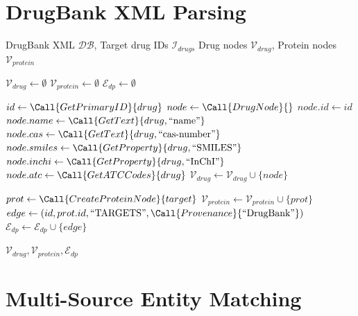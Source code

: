\documentclass[11pt,a4paper]{article}
\begin{document}
\newpage
\section{DrugBank XML Parsing}

\begin{algorithm}[H]
\caption{ParseDrugBank: Extract Drug Information from XML}
\label{alg:drugbank}
\begin{algorithmic}[1]
\REQUIRE DrugBank XML $\mathcal{DB}$, Target drug IDs $\mathcal{I}_{drugs}$
\ENSURE Drug nodes $\mathcal{V}_{drug}$, Protein nodes $\mathcal{V}_{protein}$

\STATE $\mathcal{V}_{drug} \gets \emptyset$
\STATE $\mathcal{V}_{protein} \gets \emptyset$
\STATE $\mathcal{E}_{dp} \gets \emptyset$

    \STATE $id \gets \Call{GetPrimaryID}{drug}$
        \STATE {}
        \STATE $node \gets \Call{DrugNode}{}$
        \STATE $node.id \gets id$
        \STATE $node.name \gets \Call{GetText}{drug, \text{``name''}}$
        \STATE $node.cas \gets \Call{GetText}{drug, \text{``cas-number''}}$
        \STATE $node.smiles \gets \Call{GetProperty}{drug, \text{``SMILES''}}$
        \STATE $node.inchi \gets \Call{GetProperty}{drug, \text{``InChI''}}$
        \STATE $node.atc \gets \Call{GetATCCodes}{drug}$
        \STATE $\mathcal{V}_{drug} \gets \mathcal{V}_{drug} \cup \{node\}$
        
        \STATE {}
            \STATE $prot \gets \Call{CreateProteinNode}{target}$
            \STATE $\mathcal{V}_{protein} \gets \mathcal{V}_{protein} \cup \{prot\}$
            \STATE $edge \gets (id, prot.id, \text{``TARGETS''}, \Call{Provenance}{\text{``DrugBank''}})$
            \STATE $\mathcal{E}_{dp} \gets \mathcal{E}_{dp} \cup \{edge\}$
        \ENDFOR
    \ENDIF
\ENDFOR

\RETURN $\mathcal{V}_{drug}, \mathcal{V}_{protein}, \mathcal{E}_{dp}$
\end{algorithmic}
\end{algorithm}

\newpage
\section{Multi-Source Entity Matching}
\end{document}
